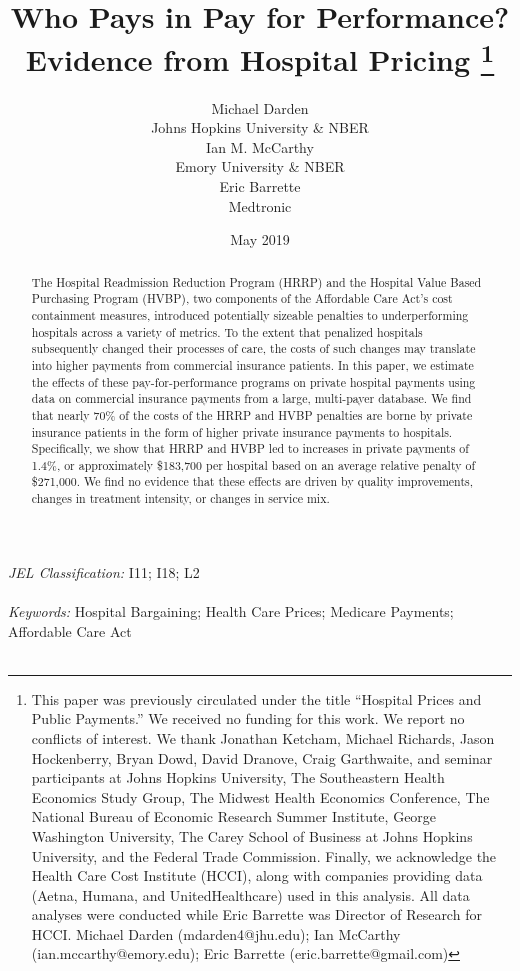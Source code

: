 \documentclass[12pt]{article}
\begin{document}
\title{Who Pays in Pay for Performance? Evidence from Hospital Pricing \thanks{This paper was previously circulated under the title ``Hospital Prices and Public Payments.''  We received no funding for this work.  We report no conflicts of interest. We thank Jonathan Ketcham, Michael Richards, Jason Hockenberry, Bryan Dowd, David Dranove, Craig Garthwaite, and seminar participants at Johns Hopkins University, The Southeastern Health Economics Study Group, The Midwest Health Economics Conference, The National Bureau of Economic Research Summer Institute, George Washington University, The Carey School of Business at Johns Hopkins University, and the Federal Trade Commission. Finally, we acknowledge the Health Care Cost Institute (HCCI), along with companies providing data (Aetna, Humana, and UnitedHealthcare) used in this analysis.  All data analyses were conducted while Eric Barrette was Director of Research for HCCI. Michael Darden (mdarden4@jhu.edu); Ian McCarthy (ian.mccarthy@emory.edu); Eric Barrette (eric.barrette@gmail.com)}}
\author{%
  Michael Darden \\[-0.5ex]
  Johns Hopkins University \& NBER \\
  Ian M. McCarthy \\[-0.5ex]
  Emory University \& NBER \\
  Eric Barrette \\[-0.5ex]
  Medtronic
}
\date{May 2019}

\maketitle

\begin{abstract}
\noindent The Hospital Readmission Reduction Program (HRRP) and the Hospital Value Based Purchasing Program (HVBP), two components of the Affordable Care Act's cost containment measures, introduced potentially sizeable penalties to underperforming hospitals across a variety of metrics. To the extent that penalized hospitals subsequently changed their processes of care, the costs of such changes may translate into higher payments from commercial insurance patients. In this paper, we estimate the effects of these pay-for-performance programs on private hospital payments using data on commercial insurance payments from a large, multi-payer database. We find that nearly 70\% of the costs of the HRRP and HVBP penalties are borne by private insurance patients in the form of higher private insurance payments to hospitals. Specifically, we show that HRRP and HVBP led to increases in private payments of 1.4\%, or approximately \$183,700 per hospital based on an average relative penalty of \$271,000. We find no evidence that these effects are driven by quality improvements, changes in treatment intensity, or changes in service mix.
\end{abstract}
\noindent \textit{JEL Classification:} I11; I18; L2 \\\\
\noindent \textit{Keywords:} Hospital Bargaining; Health Care Prices; Medicare Payments; Affordable Care Act\\\\
\end{document}
